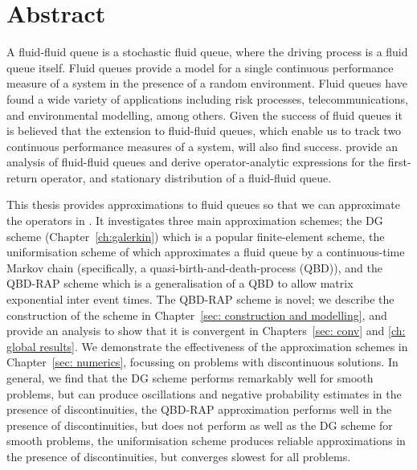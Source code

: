 \chapter{Abstract}
\label{ch:abstract}
A fluid-fluid queue is a stochastic fluid queue, where the driving process is a fluid queue itself. Fluid queues provide a model for a single continuous performance measure of a system in the presence of a random environment. Fluid queues have found a wide variety of applications including risk processes, telecommunications, and environmental modelling, among others. Given the success of fluid queues it is believed that the extension to fluid-fluid queues, which enable us to track two continuous performance measures of a system, will also find success. \cite{bo2014} provide an analysis of fluid-fluid queues and derive operator-analytic expressions for the first-return operator, and stationary distribution of a fluid-fluid queue.

This thesis provides approximations to fluid queues so that we can approximate the operators in \cite{bo2014}. It investigates three main approximation schemes; the DG scheme (Chapter~\ref{ch:galerkin}) which is a popular finite-element scheme, the uniformisation scheme of \cite{bo2013} which approximates a fluid queue by a continuous-time Markov chain (specifically, a quasi-birth-and-death-process (QBD)), and the QBD-RAP scheme which is a generalisation of a QBD to allow matrix exponential inter event times. The QBD-RAP scheme is novel; we describe the construction of the scheme in Chapter~\ref{sec: construction and modelling}, and provide an analysis to show that it is convergent in Chapters~\ref{sec: conv} and \ref{ch: global results}. We demonstrate the effectiveness of the approximation schemes in Chapter~\ref{sec: numerics}, focussing on problems with discontinuous solutions. In general, we find that the DG scheme performs remarkably well for smooth problems, but can produce oscillations and negative probability estimates in the presence of discontinuities, the QBD-RAP approximation performs well in the presence of discontinuities, but does not perform as well as the DG scheme for smooth problems, the uniformisation scheme produces reliable approximations in the presence of discontinuities, but converges slowest for all problems. 


